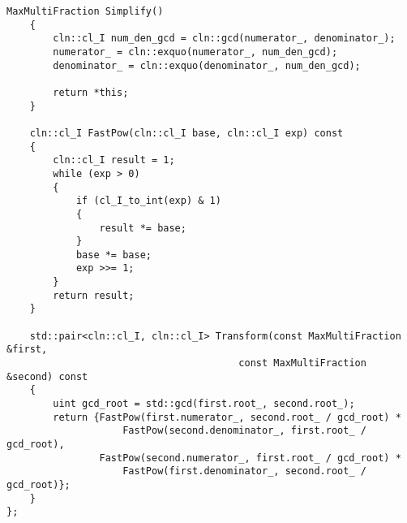 \begin{lstlisting}[caption=fraction.h\label{listing:fraction}]
    MaxMultiFraction Simplify()
    {
        cln::cl_I num_den_gcd = cln::gcd(numerator_, denominator_);
        numerator_ = cln::exquo(numerator_, num_den_gcd);
        denominator_ = cln::exquo(denominator_, num_den_gcd);

        return *this;
    }

    cln::cl_I FastPow(cln::cl_I base, cln::cl_I exp) const
    {
        cln::cl_I result = 1;
        while (exp > 0)
        {
            if (cl_I_to_int(exp) & 1)
            {
                result *= base;
            }
            base *= base;
            exp >>= 1;
        }
        return result;
    }

    std::pair<cln::cl_I, cln::cl_I> Transform(const MaxMultiFraction &first, 
                                        const MaxMultiFraction &second) const
    {
        uint gcd_root = std::gcd(first.root_, second.root_);
        return {FastPow(first.numerator_, second.root_ / gcd_root) *
                    FastPow(second.denominator_, first.root_ / gcd_root),
                FastPow(second.numerator_, first.root_ / gcd_root) *
                    FastPow(first.denominator_, second.root_ / gcd_root)};
    }
};

\end{lstlisting}